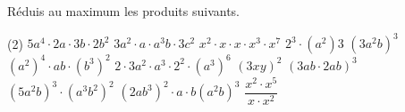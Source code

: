 %
%
Réduis au maximum les produits suivants.
	\begin{tasks}(2)
		\task $5a^4\cdot 2a\cdot 3b\cdot 2b^2$
		\task $3a^2\cdot a\cdot a^3b\cdot 3c^2$
		\task $x^2\cdot x\cdot x\cdot x^3\cdot x^7$
		\task $2^3\cdot (a^2)3$
		\task $(3a^2b)^3$
		\task $(a^2)^4\cdot ab\cdot (b^3)^2$
		\task $2\cdot 3a^2\cdot a^3\cdot 2^2\cdot (a^3)^6$
		\task $(3xy)^2$
		\task $(3ab\cdot2ab)^3$
		\task $(5a^2b)^3\cdot (a^3b^2)^2$
		\task $(2ab^3)^2\cdot a\cdot b(a^2b)^3$
		\task $\dfrac{x^2\cdot x^5}{x\cdot x^2}$
	\end{tasks}
